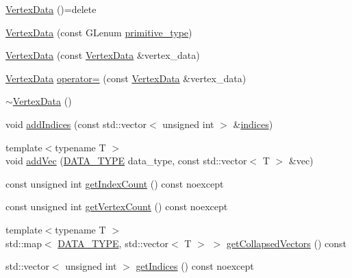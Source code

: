 \begin{DoxyCompactItemize}
\item 
\hyperlink{class_graphics_1_1_vertex_data_a5f7a4162413a61c94cba76b528c17cc6}{Vertex\+Data} ()=delete
\item 
\hyperlink{class_graphics_1_1_vertex_data_aab133d7bc7567df43e6055f81e2ed23c}{Vertex\+Data} (const G\+Lenum \hyperlink{class_graphics_1_1_vertex_data_a3940832a3699c42ea2d9f4e0943653aa}{primitive\+\_\+type})
\item 
\hyperlink{class_graphics_1_1_vertex_data_aaf7331434454cb253f5ad5b86a8eec99}{Vertex\+Data} (const \hyperlink{class_graphics_1_1_vertex_data}{Vertex\+Data} \&vertex\+\_\+data)
\item 
\hyperlink{class_graphics_1_1_vertex_data}{Vertex\+Data} \hyperlink{class_graphics_1_1_vertex_data_abda73a49d1b280ee091afd53973c3448}{operator=} (const \hyperlink{class_graphics_1_1_vertex_data}{Vertex\+Data} \&vertex\+\_\+data)
\item 
\hyperlink{class_graphics_1_1_vertex_data_a59b5214fe3d6b6f9425032c86abf65cb}{$\sim$\+Vertex\+Data} ()
\item 
void \hyperlink{class_graphics_1_1_vertex_data_a9d7dfbf44faa4ebeeb052d9a49ec72c4}{add\+Indices} (const std\+::vector$<$ unsigned int $>$ \&\hyperlink{class_graphics_1_1_vertex_data_a9b777aa4bf035e805b2957fbcd158842}{indices})
\item 
{\footnotesize template$<$typename T $>$ }\\void \hyperlink{class_graphics_1_1_vertex_data_a1432af05a48b67a06c711910bb495c6e}{add\+Vec} (\hyperlink{class_graphics_1_1_vertex_data_a50e88236939dc2a3ec4df7aeb728620e}{D\+A\+T\+A\+\_\+\+T\+Y\+P\+E} data\+\_\+type, const std\+::vector$<$ T $>$ \&vec)
\item 
const unsigned int \hyperlink{class_graphics_1_1_vertex_data_a0c58a46431db14740109e6cadb322e4e}{get\+Index\+Count} () const noexcept
\item 
const unsigned int \hyperlink{class_graphics_1_1_vertex_data_afc9fb219a54d93cc0796424bd9d1a7db}{get\+Vertex\+Count} () const noexcept
\item 
{\footnotesize template$<$typename T $>$ }\\std\+::map$<$ \hyperlink{class_graphics_1_1_vertex_data_a50e88236939dc2a3ec4df7aeb728620e}{D\+A\+T\+A\+\_\+\+T\+Y\+P\+E}, std\+::vector$<$ T $>$ $>$ \hyperlink{class_graphics_1_1_vertex_data_a860575a29aa889f2a1028f2b8a255adc}{get\+Collapsed\+Vectors} () const 
\item 
std\+::vector$<$ unsigned int $>$ \hyperlink{class_graphics_1_1_vertex_data_a39b62d7b756b924aed1025d725a2316a}{get\+Indices} () const noexcept

\end{DoxyCompactItemize}
